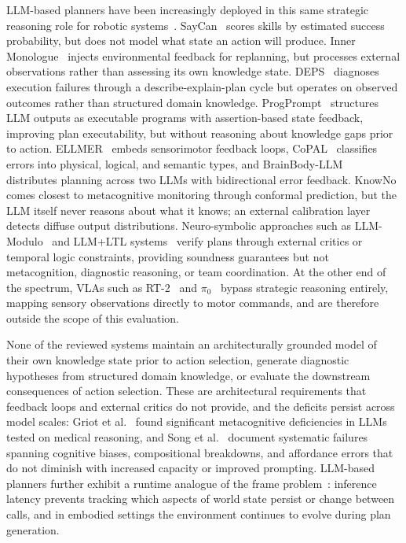 \documentclass[letterpaper, 10 pt, conference]{ieeeconf}  %
\begin{document}
LLM-based planners have been increasingly deployed 
in this same strategic reasoning role for robotic 
systems~\cite{raptis2025agentic-e5d, zhang2025robridge-edf}. SayCan~\cite{ahn2022do-a14} scores skills by estimated 
success probability, but does not model what state an action will produce. Inner Monologue~\cite{huang2023innermonologue} injects 
environmental feedback for replanning, but processes 
external observations rather than assessing its own 
knowledge state. DEPS~\cite{wang2023deps} diagnoses 
execution failures through a describe-explain-plan 
cycle but operates on observed outcomes rather than 
structured domain knowledge. ProgPrompt~\cite{singh2022progprompt} structures LLM outputs as executable programs with assertion-based 
state feedback, improving plan executability, but without reasoning about knowledge gaps prior to action. ELLMER~\cite{monwilliams2025ellmer} embeds 
sensorimotor feedback loops, 
CoPAL~\cite{joublin2024copal} classifies errors into 
physical, logical, and semantic types, and 
BrainBody-LLM~\cite{bhat2025brainbody} distributes 
planning across two LLMs with bidirectional error 
feedback. KnowNo~\cite{ren2023knowno} comes closest 
to metacognitive monitoring through conformal 
prediction, but the LLM itself never reasons about 
what it knows; an external calibration layer detects 
diffuse output distributions. Neuro-symbolic approaches 
such as LLM-Modulo~\cite{kambhampati2024llmmodulo} and 
LLM+LTL systems~\cite{liu2023lang2ltl, 
yang2024safetychip} verify plans through external 
critics or temporal logic constraints, providing 
soundness guarantees but not metacognition, diagnostic 
reasoning, or team coordination. At the other end of the spectrum, VLAs such as RT-2~\cite{zitkovich2023rt-2-889} and 
\(\pi_0\)~\cite{blacknoyearpi0-e8e} bypass strategic 
reasoning entirely, mapping sensory observations directly to motor commands, and are therefore outside the scope of this evaluation.

None of the reviewed systems maintain an architecturally 
grounded model of their own knowledge state prior to 
action selection, generate diagnostic hypotheses from 
structured domain knowledge, or evaluate the downstream 
consequences of action selection. These are architectural requirements that feedback loops and external critics do not provide, and the deficits persist across model scales: Griot et al.~\cite{griot2025large} found significant 
metacognitive deficiencies in LLMs tested on medical 
reasoning, and Song et al.~\cite{song2025survey} document 
systematic failures spanning cognitive biases, compositional breakdowns, and affordance errors that do not diminish with increased capacity or improved prompting. LLM-based planners further exhibit a runtime analogue of the frame problem~\cite{mccarthy1981some}: inference latency prevents tracking which aspects of world state persist or change between calls, and in embodied 
settings the environment continues to evolve during plan 
generation.
\end{document}
